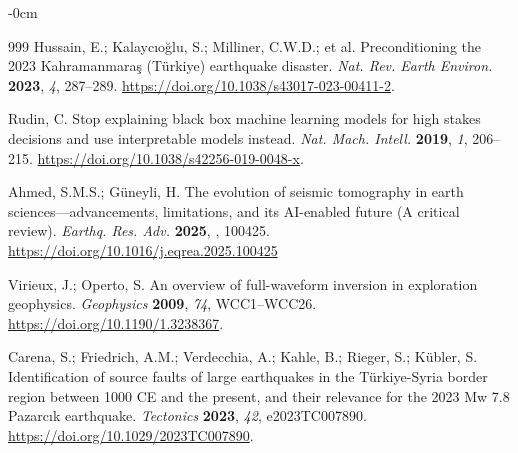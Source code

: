 \documentclass[data,article,accept,pdftex,moreauthors]{Definitions/mdpi}
\begin{document}
\begin{adjustwidth}{-\extralength}{0cm}
\begin{thebibliography}{999}
Hussain, E.; Kalaycıoğlu, S.; Milliner, C.W.D.; et al. Preconditioning the 2023 Kahramanmara\c{s} (Türkiye) earthquake disaster. \emph{Nat. Rev. Earth Environ.} \textbf{2023}, \emph{4}, 287--289. \url{https://doi.org/10.1038/s43017-023-00411-2}.

Rudin, C. Stop explaining black box machine learning models for high stakes decisions and use interpretable models instead. \emph{Nat. Mach. Intell.} \textbf{2019}, \emph{1}, 206--215. \url{https://doi.org/10.1038/s42256-019-0048-x}.

Ahmed, S.M.S.; G{\"u}neyli, H. The evolution of seismic tomography in earth sciences---advancements, limitations, and its AI-enabled future (A critical review). \emph{Earthq. Res. Adv.} \textbf{2025}, \emph{}, 100425. \url{https://doi.org/10.1016/j.eqrea.2025.100425} %

Virieux, J.; Operto, S. An overview of full-waveform inversion in exploration geophysics. \emph{Geophysics} \textbf{2009}, \emph{74}, WCC1--WCC26. \url{https://doi.org/10.1190/1.3238367}.

Carena, S.; Friedrich, A.M.; Verdecchia, A.; Kahle, B.; Rieger, S.; Kübler, S. Identification of source faults of large earthquakes in the Türkiye-Syria border region between 1000 CE and the present, and their relevance for the 2023 Mw 7.8 Pazarcık earthquake. \emph{Tectonics} \textbf{2023}, \emph{42}, e2023TC007890. \url{https://doi.org/10.1029/2023TC007890}.

\end{thebibliography}
\PublishersNote{}

%

\end{adjustwidth}
\end{document}
